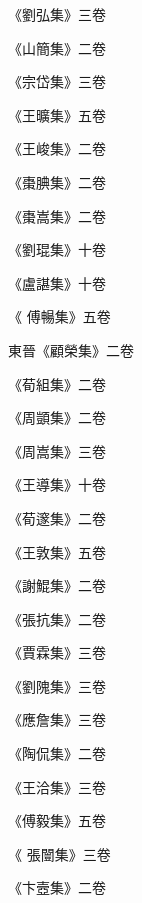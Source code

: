 \begin{pinyinscope}
 《劉弘集》三卷



 《山簡集》二卷



 《宗岱集》三卷



 《王曠集》五卷



 《王峻集》二卷



 《棗腆集》二卷



 《棗嵩集》二卷



 《劉琨集》十卷



 《盧諶集》十卷



 《
 傅暢集》五卷



 東晉《顧榮集》二卷



 《荀組集》二卷



 《周顗集》二卷



 《周嵩集》三卷



 《王導集》十卷



 《荀邃集》二卷



 《王敦集》五卷



 《謝鯤集》二卷



 《張抗集》二卷



 《賈霖集》三卷



 《劉隗集》三卷



 《應詹集》三卷



 《陶侃集》二卷



 《王洽集》三卷



 《傅毅集》五卷



 《
 張闓集》三卷



 《卞壼集》二卷




\end{pinyinscope}
